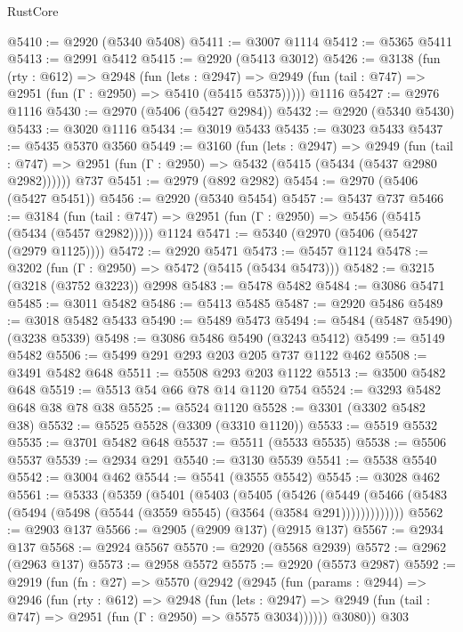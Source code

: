 \begin{lexlean}{RustCore}
\begin{coremodule}
@5410 := @2920 (@5340 @5408)
@5411 := @3007 @1114
@5412 := @5365 @5411
@5413 := @2991 @5412
@5415 := @2920 (@5413 @3012)
@5426 := @3138
    (fun (rty : @612) =>
    @2948
      (fun (lets : @2947) =>
      @2949 (fun (tail : @747) => @2951 (fun (Γ : @2950) => @5410 (@5415 @5375)))))
    @1116
@5427 := @2976 @1116
@5430 := @2970 (@5406 (@5427 @2984))
@5432 := @2920 (@5340 @5430)
@5433 := @3020 @1116
@5434 := @3019 @5433
@5435 := @3023 @5433
@5437 := @5435 @5370 @3560
@5449 := @3160
    (fun (lets : @2947) =>
    @2949
      (fun (tail : @747) => @2951 (fun (Γ : @2950) => @5432 (@5415 (@5434 (@5437 @2980 @2982))))))
    @737
@5451 := @2979 (@892 @2982)
@5454 := @2970 (@5406 (@5427 @5451))
@5456 := @2920 (@5340 @5454)
@5457 := @5437 @737
@5466 := @3184
    (fun (tail : @747) => @2951 (fun (Γ : @2950) => @5456 (@5415 (@5434 (@5457 @2982)))))
    @1124
@5471 := @5340 (@2970 (@5406 (@5427 (@2979 @1125))))
@5472 := @2920 @5471
@5473 := @5457 @1124
@5478 := @3202 (fun (Γ : @2950) => @5472 (@5415 (@5434 @5473)))
@5482 := @3215 (@3218 (@3752 @3223)) @2998
@5483 := @5478 @5482
@5484 := @3086 @5471
@5485 := @3011 @5482
@5486 := @5413 @5485
@5487 := @2920 @5486
@5489 := @3018 @5482 @5433
@5490 := @5489 @5473
@5494 := @5484 (@5487 @5490) (@3238 @5339)
@5498 := @3086 @5486 @5490 (@3243 @5412)
@5499 := @5149 @5482
@5506 := @5499 @291 @293 @203 @205 @737 @1122 @462
@5508 := @3491 @5482 @648
@5511 := @5508 @293 @203 @1122
@5513 := @3500 @5482 @648
@5519 := @5513 @54 @66 @78 @14 @1120 @754
@5524 := @3293 @5482 @648 @38 @78 @38
@5525 := @5524 @1120
@5528 := @3301 (@3302 @5482 @38)
@5532 := @5525 @5528 (@3309 (@3310 @1120))
@5533 := @5519 @5532
@5535 := @3701 @5482 @648
@5537 := @5511 (@5533 @5535)
@5538 := @5506 @5537
@5539 := @2934 @291
@5540 := @3130 @5539
@5541 := @5538 @5540
@5542 := @3004 @462
@5544 := @5541 (@3555 @5542)
@5545 := @3028 @462
@5561 := @5333
    (@5359
      (@5401
        (@5403
          (@5405
            (@5426
              (@5449
                (@5466 (@5483 (@5494 (@5498 (@5544 (@3559 @5545) (@3564 (@3584 @291)))))))))))))
@5562 := @2903 @137
@5566 := @2905 (@2909 @137) (@2915 @137)
@5567 := @2934 @137
@5568 := @2924 @5567
@5570 := @2920 (@5568 @2939)
@5572 := @2962 (@2963 @137)
@5573 := @2958 @5572
@5575 := @2920 (@5573 @2987)
@5592 := @2919
    (fun (fn : @27) =>
    @5570
      (@2942
        (@2945
          (fun (params : @2944) =>
          @2946
            (fun (rty : @612) =>
            @2948
              (fun (lets : @2947) =>
              @2949 (fun (tail : @747) => @2951 (fun (Γ : @2950) => @5575 @3034))))))
        @3080))
    @303

\end{coremodule}
\end{lexlean}
